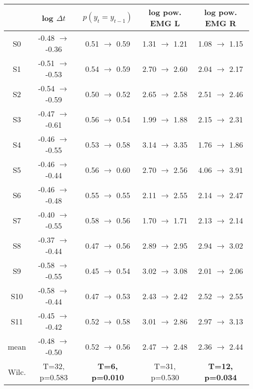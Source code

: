 \begin{tabular}{c c c c c}
\toprule
 & log $\Delta t$ & $p(y_t=y_{t-1})$ & log pow. EMG L & log pow. EMG R\\
\midrule
S0 & -0.48 $\rightarrow$ -0.36 &  0.51 $\rightarrow$  0.59 &  1.31 $\rightarrow$  1.21 &  1.08 $\rightarrow$  1.15\\
S1 & -0.51 $\rightarrow$ -0.53 &  0.54 $\rightarrow$  0.59 &  2.70 $\rightarrow$  2.60 &  2.04 $\rightarrow$  2.17\\
S2 & -0.54 $\rightarrow$ -0.59 &  0.50 $\rightarrow$  0.52 &  2.65 $\rightarrow$  2.58 &  2.51 $\rightarrow$  2.46\\
S3 & -0.47 $\rightarrow$ -0.61 &  0.56 $\rightarrow$  0.54 &  1.99 $\rightarrow$  1.88 &  2.15 $\rightarrow$  2.31\\
S4 & -0.46 $\rightarrow$ -0.55 &  0.53 $\rightarrow$  0.58 &  3.14 $\rightarrow$  3.35 &  1.76 $\rightarrow$  1.86\\
S5 & -0.46 $\rightarrow$ -0.44 &  0.56 $\rightarrow$  0.60 &  2.70 $\rightarrow$  2.56 &  4.06 $\rightarrow$  3.91\\
S6 & -0.46 $\rightarrow$ -0.48 &  0.55 $\rightarrow$  0.55 &  2.11 $\rightarrow$  2.55 &  2.14 $\rightarrow$  2.47\\
S7 & -0.40 $\rightarrow$ -0.55 &  0.58 $\rightarrow$  0.56 &  1.70 $\rightarrow$  1.71 &  2.13 $\rightarrow$  2.14\\
S8 & -0.37 $\rightarrow$ -0.44 &  0.47 $\rightarrow$  0.56 &  2.89 $\rightarrow$  2.95 &  2.94 $\rightarrow$  3.02\\
S9 & -0.58 $\rightarrow$ -0.55 &  0.45 $\rightarrow$  0.54 &  3.02 $\rightarrow$  3.08 &  2.01 $\rightarrow$  2.06\\
S10 & -0.58 $\rightarrow$ -0.44 &  0.47 $\rightarrow$  0.53 &  2.43 $\rightarrow$  2.42 &  2.52 $\rightarrow$  2.55\\
S11 & -0.45 $\rightarrow$ -0.42 &  0.52 $\rightarrow$  0.58 &  3.01 $\rightarrow$  2.86 &  2.97 $\rightarrow$  3.13\\
\midrule
mean & -0.48 $\rightarrow$ -0.50 &  0.52 $\rightarrow$  0.56 &  2.47 $\rightarrow$  2.48 &  2.36 $\rightarrow$  2.44\\
Wilc. & T=32, p=0.583 & \textbf{T=6, p=0.010} & T=31, p=0.530 & \textbf{T=12, p=0.034}\\
\bottomrule
\end{tabular}
